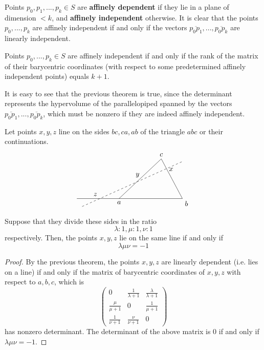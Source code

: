 \documentclass{article}
\begin{document}
    \begin{definition}
      Points $p_0, p_1, ..., p_k \in S$ are \textbf{affinely dependent} if they lie in a plane of dimension $<k$, and \textbf{affinely independent} otherwise. It is clear that the points $p_0,..., p_k$ are affinely independent if and only if the vectors $\overline{p_0p_1}, ..., \overline{p_0 p_k}$ are linearly independent. 
    \end{definition}

    \begin{theorem}
      Points $p_0, ..., p_k \in S$ are affinely independent if and only if the rank of the matrix of their barycentric coordinates (with respect to some predetermined affinely independent points) equals $k+1$. 
    \end{theorem}

    It is easy to see that the previous theorem is true, since the determinant represents the hypervolume of the parallelopiped spanned by the vectors $\overline{p_0p_1}, ..., \overline{p_0 p_k}$, which must be nonzero if they are indeed affinely independent. 

    \begin{corollary}
      Let points $x, y, z$ line on the sides $bc, ca, ab$ of the triangle $abc$ or their continuations. 
      \[\begin{tikzpicture}[scale=1.3]
        \draw (-1,0)--(3,0)--(2.2, 1.5)--(0.6,0);
        \node[below] at (0.6, 0) {$a$};
        \node[below right] at (3,0) {$b$};
        \node[above] at (2.2, 1.5) {$c$};
        \draw[dashed] (-0.8,-0.3)--(3,1.4);
        \node[above] at (-0.3, 0) {$z$};
        \node[above] at (1.3, 0.7) {$y$};
        \node[right] at (2.4, 1.1) {$x$};
      \end{tikzpicture}\]
      Suppose that they divide these sides in the ratio 
      \[\lambda: 1, \mu: 1, \nu: 1\]
      respectively. Then, the points $x, y, z$ lie on the same line if and only if 
      \[\lambda \mu \nu = -1\]
    \end{corollary}
    \begin{proof}
    By the previous theorem, the points $x, y, z$ are linearly dependent (i.e. lies on a line) if and only if the matrix of barycentric coordinates of $x, y, z$ with respect to $a, b, c$, which is
    \begin{equation}
      \begin{pmatrix}
      0 & \frac{1}{\lambda + 1} & \frac{\lambda}{\lambda + 1} \\
      \frac{\mu}{\mu + 1} & 0 & \frac{1}{\mu + 1} \\
      \frac{1}{\nu + 1} & \frac{\nu}{\nu+1} & 0
      \end{pmatrix}
    \end{equation}
    has nonzero determinant. The determinant of the above matrix is $0$ if and only if $\lambda \mu \nu = -1$. 
    \end{proof}
\end{document}
